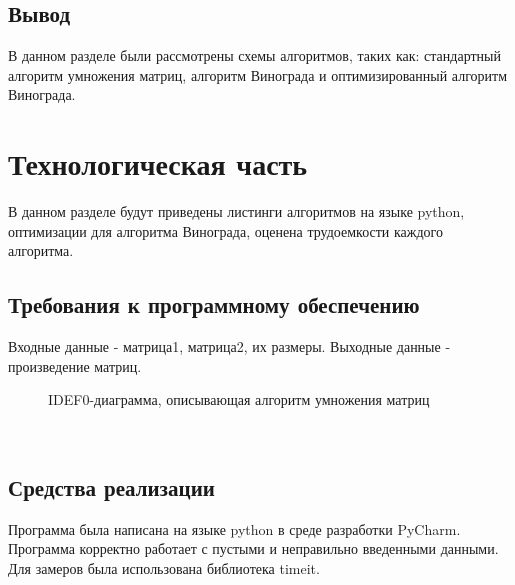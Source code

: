 \documentclass[a4paper, 14pt]{article}
\begin{document}
\subsection{Вывод}
		В данном разделе были рассмотрены схемы алгоритмов, таких как: стандартный алгоритм умножения матриц, алгоритм Винограда и оптимизированный алгоритм Винограда.\\
        
    	\newpage
        \section{Технологическая часть}
        
        В данном разделе будут приведены листинги алгоритмов на языке python, оптимизации для алгоритма Винограда, оценена трудоемкости каждого алгоритма.\\
        \subsection{Требования к программному обеспечению}
        Входные данные - матрица1, матрица2, их размеры.
        Выходные данные - произведение матриц.
          \begin{figure}[h]
        	\caption{IDEF0-диаграмма, описывающая алгоритм умножения матриц}
        	\label{fig:schema_vinograd_optimized}
        \end{figure} \\
		\subsection{Средства реализации}
		Программа была написана на языке python в среде разработки PyCharm.
		Программа корректно работает с пустыми и неправильно введенными данными.
		Для замеров была использована библиотека timeit.\\
		
\end{document}
